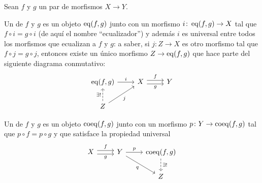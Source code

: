 \documentclass{article}
\numberwithin{equation}{section}
\theoremstyle{definition}
\begin{document}
\begin{definicion}
  Sean $f$ y $g$ un par de morfismos $X\to Y$.

  Un  de $f$ y $g$ es un objeto $\operatorname{eq} (f,g)$ junto con un
  morfismo $i\colon \operatorname{eq} (f,g) \to X$ tal que $f\circ i = g\circ i$ (de aquí el
  nombre ``ecualizador'') y además $i$ es universal entre todos los morfismos
  que ecualizan a $f$ y $g$: a saber, si $j\colon Z \to X$ es otro morfismo tal
  que $f\circ j = g\circ j$, entonces existe un único morfismo $Z\to \operatorname{eq} (f,g)$
  que hace parte del siguiente diagrama conmutativo:
  \[ \begin{tikzcd}
      \eq (f,g)\ar{r}{i} & X\ar[shift left=0.25em]{r}{f}\ar[shift right=0.25em]{r}[swap]{g} & Y \\
      Z\ar{ur}[swap]{j}\ar[dashed]{u}{\exists !}
    \end{tikzcd} \]

  Un  de $f$ y $g$ es un objeto $\operatorname{coeq} (f,g)$ junto con un
  morfismo $p\colon Y\to \operatorname{coeq} (f,g)$ tal que $p\circ f = p\circ g$ y que
  satisface la propiedad universal
  \[ \begin{tikzcd}
      X\ar[shift left=0.25em]{r}{f}\ar[shift right=0.25em]{r}[swap]{g} & Y\ar{r}{p}\ar{dr}[swap]{q} & \coeq (f,g)\ar[dashed]{d}{\exists !} \\
      & & Z
    \end{tikzcd} \]
\end{definicion}
\end{document}
